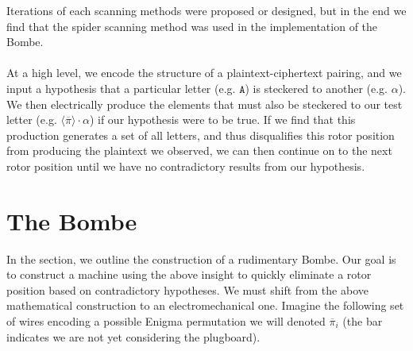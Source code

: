 Iterations of each scanning methods were proposed or designed, but in
the end we find that the spider scanning method was used in the
implementation of the Bombe.
\\\\At a high level, we encode the structure
of a plaintext-ciphertext pairing, and we input a hypothesis that a particular
letter (e.g. $\texttt{A}$) is steckered to another (e.g. $\alpha$). We then
electrically produce the elements that must also be steckered to our test letter
(e.g. $\langle\overline{\pi}\rangle\cdot\alpha$) if our hypothesis
were to be true. If we find that this production generates a set of
all letters, and thus disqualifies this rotor position from producing
the plaintext we observed, we can then continue on to the next rotor
position until we have no contradictory results from our hypothesis.

\section{The Bombe}

In the section, we outline the construction of a rudimentary Bombe.
Our goal is to construct a machine using the above insight to quickly
eliminate a rotor position based on contradictory hypotheses. We must
shift from the above mathematical construction to an
electromechanical one. %
Imagine the following set of wires encoding a possible Enigma
permutation we will denoted $\overline\pi_i$ (the bar
indicates we are not yet considering the plugboard).


